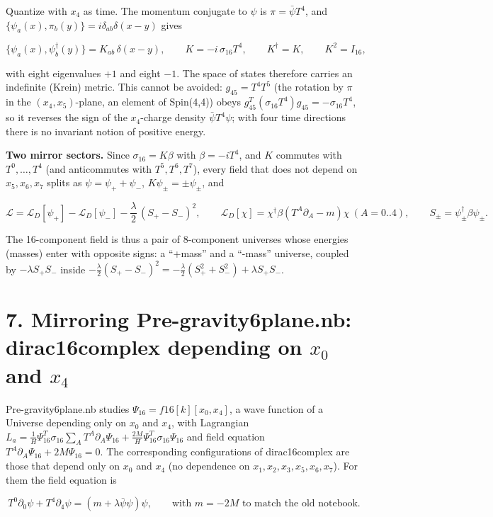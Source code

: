 \documentclass[10pt]{article}
\makeatletter
\newcommand\keepnext{\par\nopagebreak\@nobreaktrue\everypar{\@nobreakfalse\everypar{}}}
\makeatother
\begin{document}
Quantize with $x_4$ as time. The momentum conjugate to $\psi$ is $\pi = \bar\psi T^4$, and $\{\psi_a(x), \pi_b(y)\} = i\delta_{ab}\delta(x-y)$ gives\keepnext


\[
\{\psi_a(x), \psi_b^\dagger(y)\} = K_{ab}\,\delta(x-y), \qquad K = -i\,\sigma_{16}T^4, \qquad K^\dagger = K, \qquad K^2 = I_{16},
\]

with eight eigenvalues $+1$ and eight $-1$. The space of states therefore carries an indefinite (Krein) metric. This cannot be avoided: $g_{45} = T^4T^5$ (the rotation by $\pi$ in the $(x_4,x_5)$-plane, an element of Spin(4,4)) obeys $g_{45}^T(\sigma_{16}T^4)g_{45} = -\sigma_{16}T^4$, so it reverses the sign of the $x_4$-charge density $\bar\psi T^4\psi$; with four time directions there is no invariant notion of positive energy.


\textbf{Two mirror sectors.} Since $\sigma_{16} = K\beta$ with $\beta = -iT^4$, and $K$ commutes with $T^0, \dots, T^4$ (and anticommutes with $T^5, T^6, T^7$), every field that does not depend on $x_5, x_6, x_7$ splits as $\psi = \psi_+ + \psi_-$, $K\psi_\pm = \pm\psi_\pm$, and\keepnext


\[
\mathcal L = \mathcal L_D[\psi_+] - \mathcal L_D[\psi_-] - \frac\lambda2\,(S_+ - S_-)^2, \qquad \mathcal L_D[\chi] = \chi^\dagger\beta(T^A\partial_A - m)\chi\ (A=0..4), \qquad S_\pm = \psi_\pm^\dagger\beta\psi_\pm .
\]

The 16-component field is thus a pair of 8-component universes whose energies (masses) enter with opposite signs: a ``+mass'' and a ``-mass'' universe, coupled by $-\lambda S_+S_-$ inside $-\frac\lambda2(S_+-S_-)^2 = -\frac\lambda2(S_+^2 + S_-^2) + \lambda S_+S_-$.


\section*{7. Mirroring Pre-gravity6plane.nb: dirac16complex depending on $x_0$ and $x_4$}

Pre-gravity6plane.nb studies $\Psi_{16} = f16[k][x_0, x_4]$, a wave function of a Universe depending only on $x_0$ and $x_4$, with Lagrangian $L_a = \frac1H\Psi_{16}^T\sigma_{16}\sum_A T^A\partial_A\Psi_{16} + \frac{2M}{H}\Psi_{16}^T\sigma_{16}\Psi_{16}$ and field equation $T^A\partial_A\Psi_{16} + 2M\Psi_{16} = 0$. The corresponding configurations of dirac16complex are those that depend only on $x_0$ and $x_4$ (no dependence on $x_1, x_2, x_3, x_5, x_6, x_7$). For them the field equation is\keepnext


\[
T^0\partial_0\psi + T^4\partial_4\psi = (m + \lambda\bar\psi\psi)\psi, \qquad \text{with } m = -2M \text{ to match the old notebook.}
\]
\end{document}
